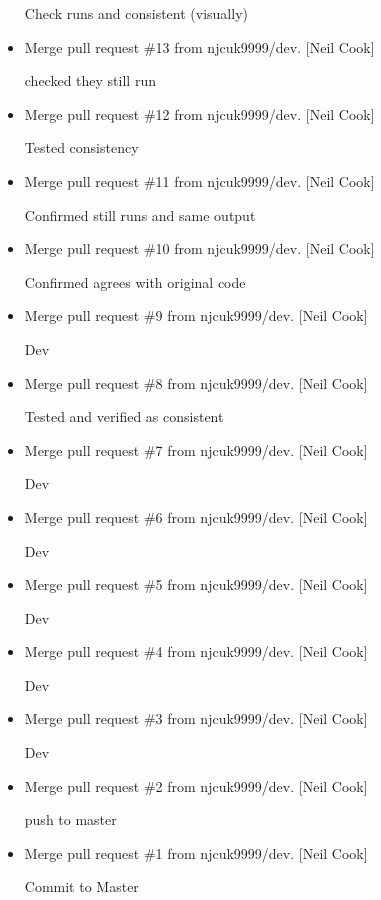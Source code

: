 \documentclass[a4paper,10pt,english]{report}
\begin{document}
\begin{itemize}
Check runs and consistent (visually)

\item {} 
Merge pull request \#13 from njcuk9999/dev. {[}Neil Cook{]}

checked they still run

\item {} 
Merge pull request \#12 from njcuk9999/dev. {[}Neil Cook{]}

Tested consistency

\item {} 
Merge pull request \#11 from njcuk9999/dev. {[}Neil Cook{]}

Confirmed still runs and same output

\item {} 
Merge pull request \#10 from njcuk9999/dev. {[}Neil Cook{]}

Confirmed agrees with original code

\item {} 
Merge pull request \#9 from njcuk9999/dev. {[}Neil Cook{]}

Dev

\item {} 
Merge pull request \#8 from njcuk9999/dev. {[}Neil Cook{]}

Tested and verified as consistent

\item {} 
Merge pull request \#7 from njcuk9999/dev. {[}Neil Cook{]}

Dev

\item {} 
Merge pull request \#6 from njcuk9999/dev. {[}Neil Cook{]}

Dev

\item {} 
Merge pull request \#5 from njcuk9999/dev. {[}Neil Cook{]}

Dev

\item {} 
Merge pull request \#4 from njcuk9999/dev. {[}Neil Cook{]}

Dev

\item {} 
Merge pull request \#3 from njcuk9999/dev. {[}Neil Cook{]}

Dev

\item {} 
Merge pull request \#2 from njcuk9999/dev. {[}Neil Cook{]}

push to master

\item {} 
Merge pull request \#1 from njcuk9999/dev. {[}Neil Cook{]}

Commit to Master

\end{itemize}
\end{document}

